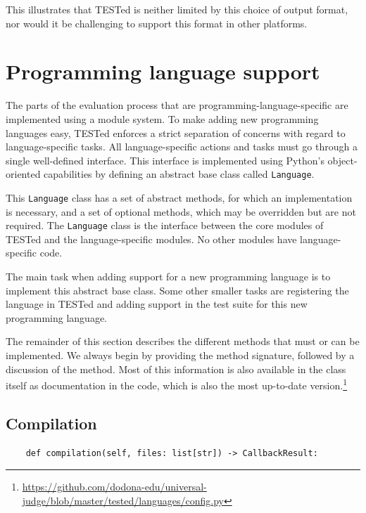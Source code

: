 \documentclass[../main]{subfiles}
\begin{document}
This illustrates that TESTed is neither limited by this choice of output format, nor would it be challenging to support this format in other platforms.

\section{Programming language support}\label{sec:programming-language-support}

The parts of the evaluation process that are programming-language-specific are implemented using a module system.
To make adding new programming languages easy, TESTed enforces a strict separation of concerns with regard to language-specific tasks.
All language-specific actions and tasks must go through a single well-defined interface.
This interface is implemented using Python's object-oriented capabilities by defining an abstract base class called \texttt{Language}.

This \texttt{Language} class has a set of abstract methods, for which an implementation is necessary, and a set of optional methods, which may be overridden but are not required.
The \texttt{Language} class is the interface between the core modules of TESTed and the language-specific modules.
No other modules have language-specific code.

The main task when adding support for a new programming language is to implement this abstract base class.
Some other smaller tasks are registering the language in TESTed and adding support in the test suite for this new programming language.

The remainder of this section describes the different methods that must or can be implemented.
We always begin by providing the method signature, followed by a discussion of the method.
Most of this information is also available in the class itself as documentation in the code, which is also the most up-to-date version.\footnote{\url{https://github.com/dodona-edu/universal-judge/blob/master/tested/languages/config.py}}

\subsection{Compilation}\label{subsec:impl-compilation}

\begin{verbatim}
    def compilation(self, files: list[str]) -> CallbackResult:
\end{verbatim}
\end{document}
